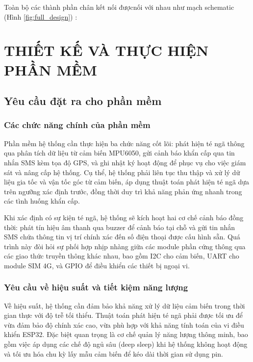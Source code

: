 \documentclass[a4paper,12pt]{report}
\begin{document}
	Toàn bộ các thành phần chân kết nối đượcnối với nhau như mạch schematic  (Hình \ref{fig:full_design}) :
	
	
	\chapter{THIẾT KẾ VÀ THỰC HIỆN PHẦN MỀM}
	
	\section{Yêu cầu đặt ra cho phần mềm}
	
	\subsection{Các chức năng chính của phần mềm}
	
	Phần mềm hệ thống cần thực hiện ba chức năng cốt lõi: phát hiện té ngã thông qua phân tích dữ liệu từ cảm biến MPU6050, gửi cảnh báo khẩn cấp qua tin nhắn SMS kèm tọa độ GPS, và ghi nhật ký hoạt động để phục vụ cho việc giám sát và nâng cấp hệ thống. Cụ thể, hệ thống phải liên tục thu thập và xử lý dữ liệu gia tốc và vận tốc góc từ cảm biến, áp dụng thuật toán phát hiện té ngã dựa trên ngưỡng xác định trước, đồng thời duy trì khả năng phản ứng nhanh trong các tình huống khẩn cấp.
	
	Khi xác định có sự kiện té ngã, hệ thống sẽ kích hoạt hai cơ chế cảnh báo đồng thời: phát tín hiệu âm thanh qua buzzer để cảnh báo tại chỗ và gửi tin nhắn SMS chứa thông tin vị trí chính xác đến số điện thoại được cấu hình sẵn. Quá trình này đòi hỏi sự phối hợp nhịp nhàng giữa các module phần cứng thông qua các giao thức truyền thông khác nhau, bao gồm I2C cho cảm biến, UART cho module SIM 4G, và GPIO để điều khiển các thiết bị ngoại vi.
	
	\subsection{Yêu cầu về hiệu suất và tiết kiệm năng lượng}
	
	Về hiệu suất, hệ thống cần đảm bảo khả năng xử lý dữ liệu cảm biến trong thời gian thực với độ trễ tối thiểu. Thuật toán phát hiện té ngã phải được tối ưu để vừa đảm bảo độ chính xác cao, vừa phù hợp với khả năng tính toán của vi điều khiển ESP32. Đặc biệt quan trọng là cơ chế quản lý năng lượng thông minh, bao gồm việc áp dụng các chế độ ngủ sâu (deep sleep) khi hệ thống không hoạt động và tối ưu hóa chu kỳ lấy mẫu cảm biến để kéo dài thời gian sử dụng pin.
	
\end{document}

